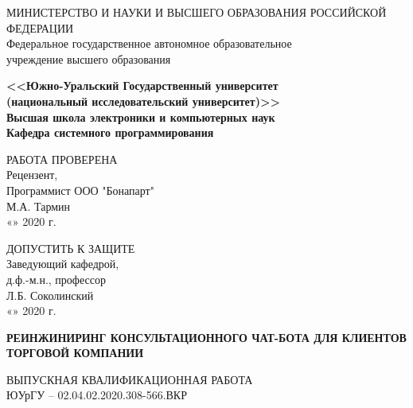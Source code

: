 \begin{titlepage}
    \begin{center}
        МИНИСТЕРСТВО И НАУКИ И ВЫСШЕГО ОБРАЗОВАНИЯ РОССИЙСКОЙ ФЕДЕРАЦИИ\\
        Федеральное государственное автономное образовательное\\
        учреждение высшего образования

        \textbf{
        <<Южно-Уральский Государственный университет\\
        (национальный исследовательский университет)>>\\
        Высшая школа электроники и компьютерных наук\\
        Кафедра системного программирования
        }
        \bigskip
        
        \noindent
        \newline
        \begin{minipage}{0.5\textwidth}
            РАБОТА ПРОВЕРЕНА\\
            Рецензент,\\
            Программист ООО "Бонапарт"\\
            \underline{\hspace{2cm}} М.А. Тармин\\
            «\underline{\hspace{0.7cm}}» \underline{\hspace{2cm}} 2020 г.
        \end{minipage}
        \vspace{\fill}
        \begin{minipage}{0.4\textwidth}
            ДОПУСТИТЬ К ЗАЩИТЕ\\
            Заведующий кафедрой,\\
            д.ф.-м.н., профессор\\
            \underline{\hspace{2cm}} Л.Б. Соколинский\\
            «\underline{\hspace{0.7cm}}» \underline{\hspace{2cm}} 2020 г.
        \end{minipage}

        \vfill
        \large\textbf{
            РЕИНЖИНИРИНГ КОНСУЛЬТАЦИОННОГО ЧАТ-БОТА ДЛЯ КЛИЕНТОВ ТОРГОВОЙ КОМПАНИИ
        }        
        \bigskip
        
        ВЫПУСКНАЯ КВАЛИФИКАЦИОННАЯ РАБОТА\\
        ЮУрГУ – 02.04.02.2020.308-566.ВКР
    \end{center}
    \vfill


\end{titlepage}
